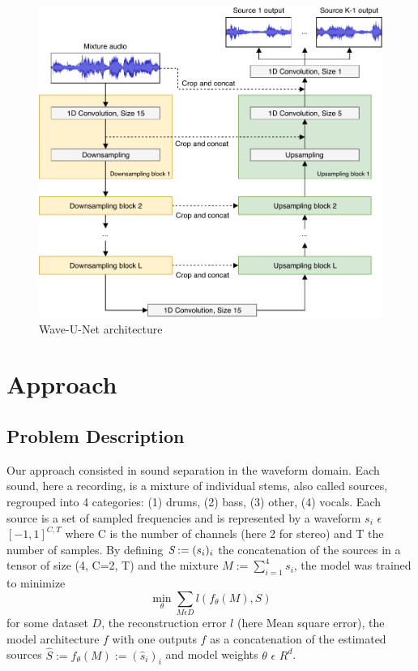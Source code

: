 \documentclass[final]{cvpr}
\begin{document}
\begin{figure}
   \includegraphics[scale=0.25]{waveunet.png}
   \caption{Wave-U-Net architecture}
   \label{waveunet-architecture}
\end{figure}

\section{Approach}

\subsection{Problem Description}
Our approach consisted in sound separation in the waveform domain. Each sound, here a recording, is a mixture of individual stems, also called sources, regrouped into 4 categories: (1) drums, (2) bass, (3) other, (4) vocals. Each source is a set of sampled frequencies and is represented by a waveform $s_i$ $\epsilon$ ${[-1, 1]}^{C,T}$ where C is the number of channels (here 2 for stereo) and T the number of samples. By defining $\emph{S}:= (s_i)_i$ the concatenation of the sources in a tensor of size (4, C=2, T) and the mixture $M:= \sum^4_{i=1} {s_i}$, the model was trained to minimize
\begin{equation}
\min_{\theta} \sum_{M \epsilon D} l(f_{\theta}(M), S)
\end{equation}
for some dataset $D$, the reconstruction error $l$ (here Mean square error), the model architecture $f$ with one outputs $f$ as a concatenation of the estimated sources $\hat{S}:=f_{\theta}(M):=({\hat{s}_i})_i$ and model weights $\theta$ $\epsilon$ $R^{d}$.
\end{document}
